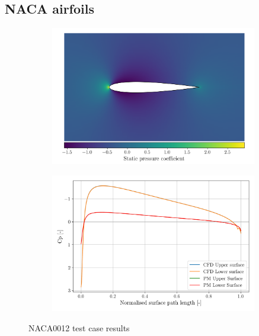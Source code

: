 \documentclass{article}
\begin{document}
\subsection{NACA airfoils}

\begin{figure}[H]
    \centering
    \begin{subfigure}{0.49\textwidth}
        \centering
        \includegraphics[width=0.99\textwidth]{figures/naca0012_cp.png}
        \caption{}
        \label{fig:naca0012_cp}
    \end{subfigure}
    \begin{subfigure}{0.49\textwidth}
        \centering
        \includegraphics[width=0.99\textwidth]{figures/naca0012_surface_cp.png}
        \caption{}
        \label{fig:naca0012_mach}
    \end{subfigure}
    \caption{NACA0012 test case results}
\end{figure}
\end{document}

